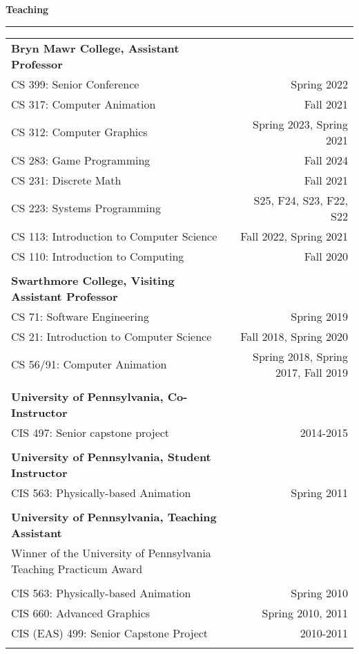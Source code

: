 \needspace{6em}
{\large {\bf Teaching}}
\vspace{0.1cm}
\hrule
\begin{tabular*}{7.1in}{@{}l@{\extracolsep\fill}r}

{\bf Bryn Mawr College, Assistant Professor} & \\
CS 399: Senior Conference & Spring 2022\\
CS 317: Computer Animation & Fall 2021\\
CS 312: Computer Graphics & Spring 2023, Spring 2021\\
CS 283: Game Programming & Fall 2024\\
CS 231: Discrete Math & Fall 2021\\
CS 223: Systems Programming & S25, F24, S23, F22, S22\\
CS 113: Introduction to Computer Science & Fall 2022, Spring 2021\\
CS 110: Introduction to Computing & Fall 2020\\
\phantom{yommomma} & \phantom{2002}\\

{\bf Swarthmore College, Visiting Assistant Professor} & \\
CS 71: Software Engineering & Spring 2019\\
CS 21: Introduction to Computer Science & Fall 2018, Spring 2020\\
CS 56/91: Computer Animation & Spring 2018, Spring 2017, Fall 2019\\
\phantom{yommomma} & \phantom{2002}\\

{\bf University of Pennsylvania, Co-Instructor} & \\
CIS 497: Senior capstone project & 2014-2015\\
\phantom{yommomma} & \phantom{2002}\\

{\bf University of Pennsylvania, Student Instructor} & \\
CIS 563: Physically-based Animation & Spring 2011\\
\phantom{yommomma} & \phantom{2002}\\
{\bf University of Pennsylvania, Teaching Assistant} & \\
Winner of the University of Pennsylvania Teaching Practicum Award & \\
\phantom{yommomma} & \phantom{2002}\\
CIS 563: Physically-based Animation & Spring 2010\\
CIS 660: Advanced Graphics & Spring 2010, 2011\\
CIS (EAS) 499: Senior Capstone Project  & 2010-2011\\
\phantom{yommomma} & \phantom{2002}\\
\end{tabular*}

\pagebreak

